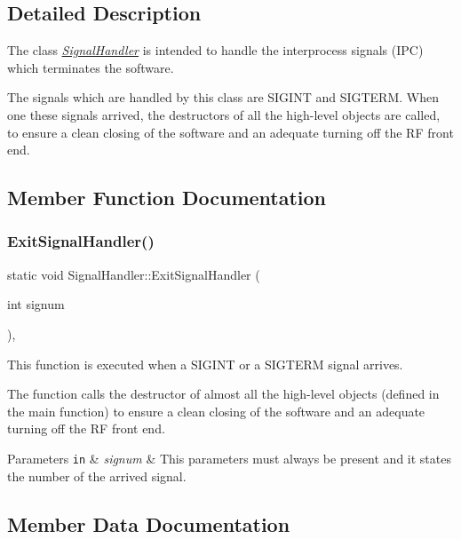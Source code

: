 \subsection{Detailed Description}
The class {\itshape \hyperlink{classSignalHandler}{Signal\+Handler}} is intended to handle the interprocess signals (I\+PC) which terminates the software. 

The signals which are handled by this class are S\+I\+G\+I\+NT and S\+I\+G\+T\+E\+RM. When one these signals arrived, the destructors of all the high-\/level objects are called, to ensure a clean closing of the software and an adequate turning off the RF front end. 

\subsection{Member Function Documentation}
\mbox{\label{classSignalHandler_af32b7213b43fd13fa12587a0c0d9b565}} 
\subsubsection{\texorpdfstring{Exit\+Signal\+Handler()}{ExitSignalHandler()}}
{\footnotesize\ttfamily static void Signal\+Handler\+::\+Exit\+Signal\+Handler (\begin{DoxyParamCaption}\item[{int}]{signum }\end{DoxyParamCaption})\hspace{0.3cm}{\ttfamily [inline]}, {\ttfamily [static]}}



This function is executed when a S\+I\+G\+I\+NT or a S\+I\+G\+T\+E\+RM signal arrives. 

The function calls the destructor of almost all the high-\/level objects (defined in the main function) to ensure a clean closing of the software and an adequate turning off the RF front end. 
\begin{DoxyParams}[1]{Parameters}
\mbox{\tt in}  & {\em signum} & This parameters must always be present and it states the number of the arrived signal. \\
\hline
\end{DoxyParams}


\subsection{Member Data Documentation}
\mbox{\label{classSignalHandler_ab3328bb82a0e67153d8ff39bf04c7196}} 
